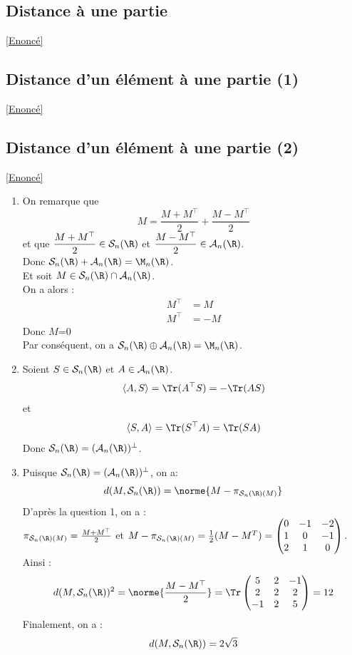 \documentclass{book}
\begin{document}
	\subsection{Distance à une partie}\label{sec:distance-a-une-partie}
		\textcolor{blue}{\hyperref[Distance à une partie]{[Enoncé]}}\\
	\subsection{Distance d'un élément à une partie (1)}\label{sec:distance-dun-element-a-une-partie-1}
		\textcolor{blue}{\hyperref[Distance d'un élément à une partie 1]{[Enoncé]}}\\
	\subsection{Distance d'un élément à une partie
		 (2)}\label{sec:distance-dun-element-a-une-partie-2}
		 \textcolor{blue}{\hyperref[Distance d'un élément à une partie 2]{[Enoncé]}}\\
	\begin{enumerate}[leftmargin=*]
		\item On remarque que \[M=\frac{M+M^\top}{2}+\frac{M-M^\top}{2}\] et que $\displaystyle\frac{M+M^\top}{2} \in\mathcal{S}_n(\R)$ et $\displaystyle \frac{M-M^\top}{2}\in\mathcal{A}_n(\R)$.\\
		Donc $\mathcal{S}_n(\R)+\mathcal{A}_n(\R)=\M_{n}(\R)$.\\
		Et soit $M\in\mathcal{S}_n(\R)\cap\mathcal{A}_n(\R)$.\\
		On a alors : 
		\begin{align*}
			M^\top&=M\\
			M^\top&=-M
		\end{align*}
		Donc $M$=0\\
		Par conséquent, on a $\mathcal{S}_n(\R)\oplus\mathcal{A}_n(\R)=\M_{n}(\R)$.
		\item Soient $S\in\mathcal{S}_n(\R)$ et $A\in\mathcal{A}_n(\R)$.\\
		\[\langle A,S\rangle=\Tr(A^\top S)=-\Tr(AS)\]
		et \[\langle S,A\rangle=\Tr(S^\top A)=\Tr(SA)\]
		Donc $\mathcal{S}_n(\R)=(\mathcal{A}_n(\R))^\perp$.
		\item Puisque $\mathcal{S}_n(\R)=(\mathcal{A}_n(\R))^\perp$, on a:\[d(M,\mathcal{S}_n(\R))=\norme{M-\pi_{\mathcal{S}_n(\R)(M)}}\]
		D'après la question 1, on a :\\ $\pi_{\mathcal{S}_n(\R)(M)}=\frac{M+M^\top}{2}$ et $M-\pi_{\mathcal{S}_n(\R)(M)}=\frac{1}{2}(M - M^T) = 
		\begin{pmatrix} 
			0 & -1 & -2 \\ 
			1 & 0 & -1 \\ 
			2 & 1 & 0 
			\end{pmatrix}.$
		Ainsi : \[d(M,\mathcal{S}_n(\R))^2=
		\norme{\frac{M-M^\top}{2}}=\Tr\begin{pmatrix}
	5&2&-1\\
	2&2&2\\
	-1&2&5
	\end{pmatrix}=12\]
	Finalement, on a : \[d(M,\mathcal{S}_n(\R))=2\sqrt{3}\]
	\end{enumerate}
	
\end{document}

